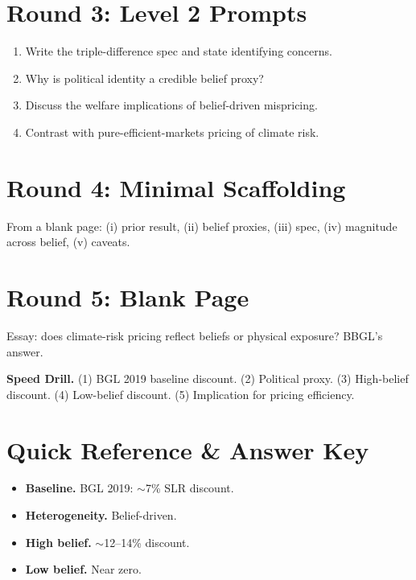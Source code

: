 \documentclass[11pt]{article}
\begin{document}
\section*{Round 3: Level 2 Prompts}
\begin{enumerate}
\item Write the triple-difference spec and state identifying concerns.
\item Why is political identity a credible belief proxy?
\item Discuss the welfare implications of belief-driven mispricing.
\item Contrast with pure-efficient-markets pricing of climate risk.
\end{enumerate}

\section*{Round 4: Minimal Scaffolding}
From a blank page: (i) prior result, (ii) belief proxies, (iii) spec, (iv) magnitude across belief, (v) caveats.

\section*{Round 5: Blank Page}
Essay: does climate-risk pricing reflect beliefs or physical exposure? BBGL's answer.

\vspace{6pt}
\begin{drillbox}
\textbf{Speed Drill.} (1) BGL 2019 baseline discount. (2) Political proxy. (3) High-belief discount. (4) Low-belief discount. (5) Implication for pricing efficiency.
\end{drillbox}

\section*{Quick Reference \& Answer Key}
\begin{answerbox}
\begin{itemize}
\item \textbf{Baseline.} BGL 2019: $\sim$7\% SLR discount.
\item \textbf{Heterogeneity.} Belief-driven.
\item \textbf{High belief.} $\sim$12--14\% discount.
\item \textbf{Low belief.} Near zero.
\end{itemize}
\end{answerbox}
\end{document}
